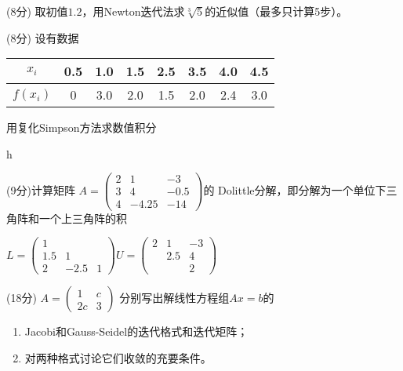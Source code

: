 \documentclass[12pt,letter]{ustcexam}
\begin{document}
\begin{CJK*}{UTF8}{song}
\begin{problems}
\vspace*{0.4\textheight}

\qu (8分) 取初值$1.2$，用Newton迭代法求$\sqrt[3]{5}$的近似值（最多只计算5步）。


\newpage

\qu (8分) 设有数据
\begin{tabular}{c|ccccccc} 
\hline
 $x_i$    & 0.5 & 1.0 & 1.5 & 2.5 & 3.5 & 4.0 & 4.5 \\
\hline 
 $f(x_i)$ &   0 & 3.0 & 2.0 & 1.5 & 2.0 & 2.4 & 3.0 \\
\hline
\end{tabular}
用复化Simpson方法求数值积分
\begin{sol}
h
\end{sol}

\vspace*{0.4\textheight}

\qu (9分)计算矩阵
$A=\begin{pmatrix} 2 & 1 &-3 \\ 3 & 4 & -0.5 \\ 4 & -4.25 &-14 \end{pmatrix}$的
Dolittle分解，即分解为一个单位下三角阵和一个上三角阵的积
\begin{sol}
$
L=
\left(\begin{array}{ccc}
1 &  &  \\
1.5 & 1 &  \\
2 & -2.5 & 1
\end{array}\right)
U=
\left(\begin{array}{ccc}
 2 & 1 & -3 \\
   & 2.5 & 4 \\
   &  & 2
\end{array}\right) 
$
\end{sol}

\vspace*{0.4\textheight}

\newpage
\qu (18分) $A=\begin{pmatrix} 1 & c \\ 2c & 3 \end{pmatrix}$ 
分别写出解线性方程组$Ax=b$的
\begin{enumerate}
  \item Jacobi和Gauss-Seidel的迭代格式和迭代矩阵；
  \item 对两种格式讨论它们收敛的充要条件。
\end{enumerate}


\end{problems}
\end{CJK*}
\end{document}
